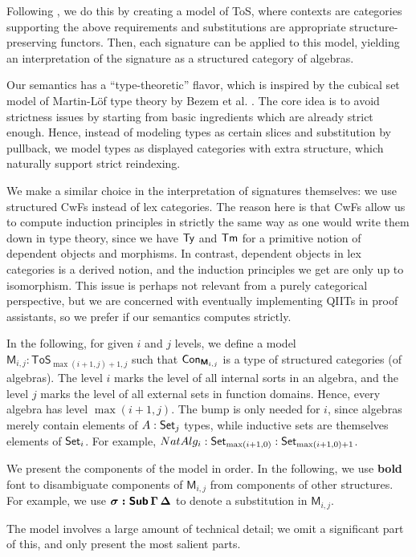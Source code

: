 \documentclass[sigplan,review,anonymous]{acmart}\settopmatter{printfolios=true,printccs=false,printacmref=false}
\newcommand{\ToS}{\mathsf{ToS}}
\newcommand{\bM}{\boldsymbol{\mathsf{M}}}
\begin{document}
Following \cite{kaposi2019constructing}, we do this by creating a model of ToS,
where contexts are categories supporting the above requirements and
substitutions are appropriate structure-preserving functors. Then, each
signature can be applied to this model, yielding an interpretation of the signature
as a structured category of algebras.

Our semantics has a ``type-theoretic'' flavor, which is inspired by the cubical
set model of Martin-Löf type theory by Bezem et al. \cite{cubical}. The core idea
is to avoid strictness issues by starting from basic ingredients which are already
strict enough. Hence, instead of modeling types as certain slices and
substitution by pullback, we model types as displayed categories with extra
structure, which naturally support strict reindexing.

We make a similar choice in the interpretation of signatures themselves: we use
structured CwFs instead of lex categories. The reason here is that CwFs allow us
to compute induction principles in strictly the same way as one would write them
down in type theory, since we have $\mathsf{Ty}$ and $\mathsf{Tm}$ for a primitive notion of
dependent objects and morphisms. In contrast, dependent objects in lex
categories is a derived notion, and the induction principles we get are only up
to isomorphism. This issue is perhaps not relevant from a purely categorical
perspective, but we are concerned with eventually implementing QIITs in proof
assistants, so we prefer if our semantics computes strictly.

In the following, for given $i$ and $j$ levels, we define a model $\bM_{i,j} :
\ToS_{\max(i+1,j)+1, j}$ such that $\Con_{\bM_{i,j}}$ is a type of structured
categories (of algebras). The level $i$ marks the level of all internal sorts in
an algebra, and the level $j$ marks the level of all external sets in function
domains. Hence, every algebra has level $\max(i+1,j)$. The bump is only needed
for $i$, since algebras merely contain elements of $A : \mathsf{Set}_j$ types, while
inductive sets are themselves elements of $\mathsf{Set}_i$. For example, $NatAlg_i :
\mathsf{Set}_{\max(i+1,0)} : \mathsf{Set}_{\max(i+1, 0)+1}$.


We present the components of the model in order. In the following, we use
\textbf{bold} font to disambiguate components of $\bM_{i,j}$ from components of other
structures. For example, we use $\boldsymbol{\sigma : \mathsf{Sub}\,\Gamma\,\Delta}$ to
denote a substitution in $\bM_{i,j}$.

The model involves a large amount of technical detail; we omit a significant
part of this, and only present the most salient parts.
\end{document}
